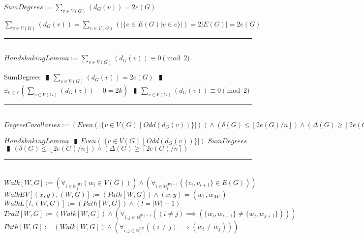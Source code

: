 \documentclass{book}
\newcommand{\abr}{:=}
\newcommand{\pipe}{$\phantom{(}\vrectangleblack\phantom{)}$}
\newcommand{\pr}[1]{\left(#1\right)}
\newcommand{\st}{\mathbin{|}}
\newcommand{\utup}[1]{\{#1\}}
\newcommand{\floor}[1]{\left\lfloor #1 \right\rfloor}
\newcommand{\ceil}[1]{\left\lceil #1 \right\rceil}
\begin{document}
$SumDegrees \abr \sum_{v \in V(G)}\pr{d_G(v)} = 2 e(G)$ \\
\begin{enumerate}
  \lit $\sum_{v \in V(G)}\pr{d_G(v)} = \sum_{v \in V(G)}\pr{|\{e \in E(G) | v \in e\}|} = 2 |E(G)| = 2 e(G)$ \\
\end{enumerate} \vspace{.75mm} \hrule \vspace{.75mm} \ \\

$HandshakingLemma \abr \sum_{v \in V(G)}\pr{d_G(v)} \equiv 0 \pmod{2}$ \\
\begin{enumerate}
  \lit SumDegrees \pipe $\sum_{v \in V(G)}\pr{d_G(v)} = 2 e(G)$ \pipe $\exists_{k \in \mathbb{Z}}\pr{\sum_{v \in V(G)}\pr{d_G(v)} - 0 = 2 k}$ \pipe $\sum_{v \in V(G)}\pr{d_G(v)} \equiv 0 \pmod{2}$
\end{enumerate} \vspace{.75mm} \hrule \vspace{.75mm} \ \\

$DegreeCorollaries \abr \pr{Even\pr{|\{v \in V(G) \st Odd\pr{d_G(v)}\}|}} \land \pr{\delta(G) \leq \floor{2 e(G) / n}} \land \pr{\Delta(G) \geq \ceil{2 e(G) / n}}$
\begin{enumerate}
  \lit $HandshakingLemma$ \pipe $Even\pr{|\{v \in V(G) \st Odd\pr{d_G(v)}\}|}$
  \lit $SumDegrees$ \pipe $\pr{\delta(G) \leq \floor{2 e(G) / n}} \land \pr{\Delta(G) \geq \ceil{2 e(G) / n}}$
\end{enumerate} \vspace{.75mm} \hrule \vspace{.75mm} \ \\ 

$Walk[W, G] \abr \pr{\forall_{i \in \mathbb{N}_1^{|W|}}\pr{w_i \in V(G)}} \land \pr{\forall_{i \in \mathbb{N}_1^{|W| - 1}}\pr{\utup{v_i, v_{i + 1}} \in E(G)}}$ \\
$WalkEV[(x, y), (W, G)] \abr (Path[W, G]) \land (x, y) = (w_1, w_{|W|})$ \\
$WalkL[l, (W, G)] \abr (Path[W, G]) \land (l = |W| - 1)$ \\
$Trail[W, G] \abr (Walk[W, G]) \land \pr{\forall_{i, j \in \mathbb{N}_1^{|W| - 1}}\pr{(i \neq j) \implies (\utup{w_i, w_{i + 1}} \neq \utup{w_j, w_{j + 1}})}}$ \\
$Path[W, G] \abr (Walk[W, G]) \land \pr{\forall_{i, j \in \mathbb{N}_1^{|W|}}\pr{(i \neq j) \implies (w_i \neq w_j)}}$ \\
\end{document}
